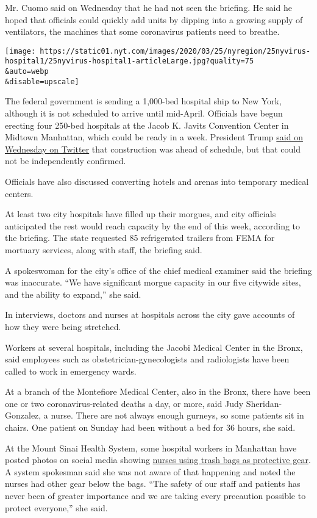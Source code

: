 Mr. Cuomo said on Wednesday that he had not seen the briefing. He said
he hoped that officials could quickly add units by dipping into a
growing supply of ventilators, the machines that some coronavirus
patients need to breathe.

\texttt{[image: https://static01.nyt.com/images/2020/03/25/nyregion/25nyvirus-hospital1/25nyvirus-hospital1-articleLarge.jpg?quality=75\\\&auto=webp\\\&disable=upscale]}

The federal government is sending a 1,000-bed hospital ship to New York,
although it is not scheduled to arrive until mid-April. Officials have
begun erecting four 250-bed hospitals at the Jacob K. Javits Convention
Center in Midtown Manhattan, which could be ready in a week. President
Trump
\href{https://twitter.com/realDonaldTrump/status/1242826052310794240}{said
on Wednesday on Twitter} that construction was ahead of schedule, but
that could not be independently confirmed.

Officials have also discussed converting hotels and arenas into
temporary medical centers.

At least two city hospitals have filled up their morgues, and city
officials anticipated the rest would reach capacity by the end of this
week, according to the briefing. The state requested 85 refrigerated
trailers from FEMA for mortuary services, along with staff, the briefing
said.

A spokeswoman for the city's office of the chief medical examiner said
the briefing was inaccurate. ``We have significant morgue capacity in
our five citywide sites, and the ability to expand,'' she said.

In interviews, doctors and nurses at hospitals across the city gave
accounts of how they were being stretched.

Workers at several hospitals, including the Jacobi Medical Center in the
Bronx, said employees such as obstetrician-gynecologists and
radiologists have been called to work in emergency wards.

At a branch of the Montefiore Medical Center, also in the Bronx, there
have been one or two coronavirus-related deaths a day, or more, said
Judy Sheridan-Gonzalez, a nurse. There are not always enough gurneys, so
some patients sit in chairs. One patient on Sunday had been without a
bed for 36 hours, she said.

At the Mount Sinai Health System, some hospital workers in Manhattan
have posted photos on social media showing
\href{https://twitter.com/brianmrosenthal/status/1241744193648762882}{nurses
using trash bags as protective gear}. A system spokesman said she was
not aware of that happening and noted the nurses had other gear below
the bags. ``The safety of our staff and patients has never been of
greater importance and we are taking every precaution possible to
protect everyone,'' she said.

